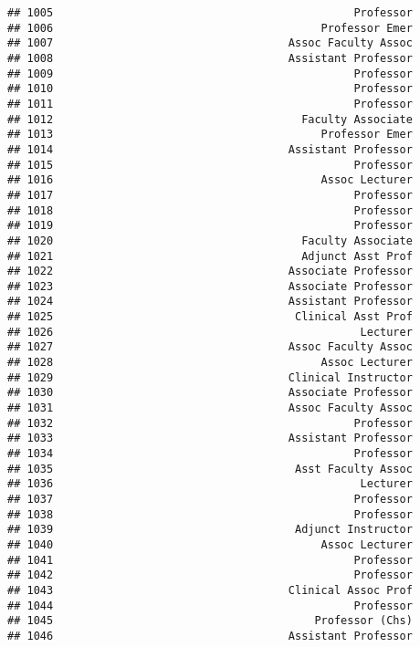 \documentclass[
]{article}
\begin{document}
\begin{verbatim}
## 1005                                              Professor
## 1006                                         Professor Emer
## 1007                                    Assoc Faculty Assoc
## 1008                                    Assistant Professor
## 1009                                              Professor
## 1010                                              Professor
## 1011                                              Professor
## 1012                                      Faculty Associate
## 1013                                         Professor Emer
## 1014                                    Assistant Professor
## 1015                                              Professor
## 1016                                         Assoc Lecturer
## 1017                                              Professor
## 1018                                              Professor
## 1019                                              Professor
## 1020                                      Faculty Associate
## 1021                                      Adjunct Asst Prof
## 1022                                    Associate Professor
## 1023                                    Associate Professor
## 1024                                    Assistant Professor
## 1025                                     Clinical Asst Prof
## 1026                                               Lecturer
## 1027                                    Assoc Faculty Assoc
## 1028                                         Assoc Lecturer
## 1029                                    Clinical Instructor
## 1030                                    Associate Professor
## 1031                                    Assoc Faculty Assoc
## 1032                                              Professor
## 1033                                    Assistant Professor
## 1034                                              Professor
## 1035                                     Asst Faculty Assoc
## 1036                                               Lecturer
## 1037                                              Professor
## 1038                                              Professor
## 1039                                     Adjunct Instructor
## 1040                                         Assoc Lecturer
## 1041                                              Professor
## 1042                                              Professor
## 1043                                    Clinical Assoc Prof
## 1044                                              Professor
## 1045                                        Professor (Chs)
## 1046                                    Assistant Professor

\end{verbatim}
\end{document}
